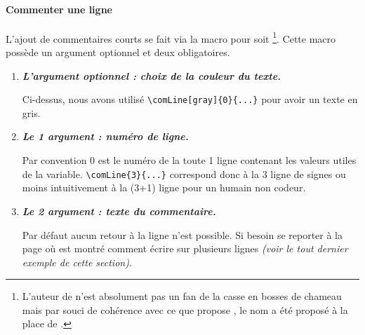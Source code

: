 \documentclass[12pt,a4paper]{article}
\begin{document}




\paragraph{Commenter une ligne}

L'ajout de commentaires courts se fait via la macro  pour  soit 
\footnote{
    L'auteur de  n'est absolument pas un fan de la casse en bosses de chameau mais par souci de cohérence avec ce que propose , le nom  a été proposé à la place de .
}.
Cette macro possède un argument optionnel et deux obligatoires.

\begin{enumerate}
    \item \textbf{\emph{L'argument optionnel : choix de la couleur du texte.}}
          
          \smallskip
          
          Ci-dessus, nous avons utilisé \verb#\comLine[gray]{0}{...}# pour avoir un texte en gris.


    \medskip
    \item \textbf{\emph{Le 1\ier{} argument : numéro de ligne.}}
          
          \smallskip
          
          Par convention $0$ est le numéro de la toute 1\iere{} ligne contenant les valeurs utiles de la variable.
          \verb#\comLine{3}{...}# correspond donc à la 3\ieme{} ligne de signes ou moins intuitivement à la (3+1)\ieme{} ligne pour un humain non codeur.

    \medskip
    \item \textbf{\emph{Le 2\ieme{} argument : texte du commentaire.}}
          
          \smallskip
          
          Par défaut aucun retour à la ligne n'est possible.
          Si besoin se reporter à la  page \pageref{grapgsign-com-two-lines} où est montré comment écrire sur plusieurs lignes \emph{(voir le tout dernier exemple de cette section)}.
\end{enumerate}
\end{document}
